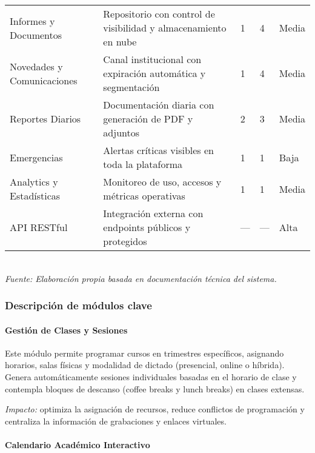 \begin{table}[H]
\begin{tabular}{p{3.2cm} p{5.5cm} p{1.5cm} p{1.5cm} p{1.8cm}}
Informes y Documentos & Repositorio con control de visibilidad y almacenamiento en nube & 1 & 4 & Media \\[0.2cm]

Novedades y Comunicaciones & Canal institucional con expiración automática y segmentación & 1 & 4 & Media \\[0.2cm]

Reportes Diarios & Documentación diaria con generación de PDF y adjuntos & 2 & 3 & Media \\[0.2cm]

Emergencias & Alertas críticas visibles en toda la plataforma & 1 & 1 & Baja \\[0.2cm]

Analytics y Estadísticas & Monitoreo de uso, accesos y métricas operativas & 1 & 1 & Media \\[0.2cm]

API RESTful & Integración externa con endpoints públicos y protegidos & --- & --- & Alta \\
\bottomrule
\end{tabular}
\\[0.2cm]
\textit{Fuente: Elaboración propia basada en documentación técnica del sistema.}
\end{table}

\subsubsection{Descripción de módulos clave}

\paragraph{Gestión de Clases y Sesiones}

Este módulo permite programar cursos en trimestres específicos, asignando horarios, salas físicas y modalidad de dictado (presencial, online o híbrida). Genera automáticamente sesiones individuales basadas en el horario de clase y contempla bloques de descanso (coffee breaks y lunch breaks) en clases extensas.

\textit{Impacto:} optimiza la asignación de recursos, reduce conflictos de programación y centraliza la información de grabaciones y enlaces virtuales.

\paragraph{Calendario Académico Interactivo}

